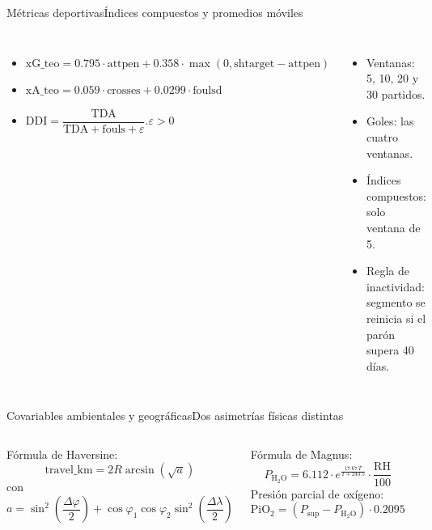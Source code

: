 \documentclass[aspectratio=169,11pt]{beamer}
\begin{document}
\begin{frame}{M\'etricas deportivas}{\'Indices compuestos y promedios m\'oviles}
	\begin{columns}[T,onlytextwidth]
		\par\vskip 2mm
		\footnotesize
		\begin{itemize}
			\item $\text{xG\_teo} = 0{.}795 \cdot \text{attpen} + 0{.}358 \cdot \max(0, \text{shtarget} - \text{attpen})$
			\item $\text{xA\_teo} = 0{.}059 \cdot \text{crosses} + 0{.}0299 \cdot \text{foulsd}$
			\item $\text{DDI} = \dfrac{\text{TDA}}{\text{TDA} + \text{fouls} + \varepsilon} \text{.} \varepsilon>0 $
		\end{itemize}
		\par\vskip 2mm
		\footnotesize
		\begin{itemize}
			\item Ventanas: 5, 10, 20 y 30 partidos.
			\item Goles: las cuatro ventanas.
			\item \'Indices compuestos: solo ventana de 5.
			\item Regla de inactividad: segmento se reinicia si el par\'on supera 40 días.
		\end{itemize}
	\end{columns}
	\vskip 1mm
\end{frame}

\begin{frame}{Covariables ambientales y geogr\'aficas}{Dos asimetr\'ias f\'isicas distintas}
	\vspace*{-0.65cm}
	\begin{columns}[T,onlytextwidth]
		\par\vskip 2mm
		\footnotesize F\'ormula de Haversine:
		\[
		\text{travel\_km} = 2R \arcsin(\sqrt{a})
		\]
		con
		\[
		a = \sin^2\!\left(\frac{\Delta\varphi}{2}\right) + \cos\varphi_1 \cos\varphi_2 \sin^2\!\left(\frac{\Delta\lambda}{2}\right)
		\]
		\par\vskip 2mm
		\footnotesize F\'ormula de Magnus:
		\[
		P_{\mathrm{H_2O}} = 6{.}112 \cdot e^{\frac{17{.}67\,T}{T + 243{.}5}} \cdot \frac{\mathrm{RH}}{100}
		\]
		\footnotesize Presi\'on parcial de ox\'igeno\supercite{West1996}:
		\[
		\mathrm{PiO_2} = (P_{\text{sup}} - P_{\mathrm{H_2O}}) \cdot 0{.}2095
		\]
	\end{columns}
\end{frame}
\end{document}
